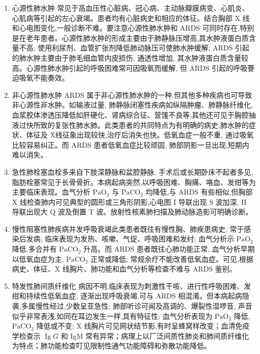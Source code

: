 \documentclass[10pt]{article}
\begin{document}
\begin{enumerate}
  \item 心源性肺水肿 常见于高血压性心脏病、冠心病、主动脉瓣膜病变、心肌炎、心肌病等引起的左心衰竭。患者均有心脏病史和相应的体征。结合胸部 X 线和心电图变化,一般诊断不难。要注意心源性肺水肿和 ARDS 可同时存在,特别是在老年患者。心源性肺水肿的形成主要由于肺静脉压增高,其水肿液蛋白质含量不高, 使用利尿剂、血管扩张剂降低肺动脉压可使肺水肿缓解; ARDS 引起的肺水肿主要由于肺毛细血管内皮损伤, 通透性增加, 其水肿液蛋白质含量较高。心源性肺水肿引起的呼吸困难常可因吸氧而缓解, 但 ARDS 引起的呼吸謇迫吸氧不能奏效。

  \item 非心源性肺水肿 ARDS 属于非心源性肺水肿的一种,但其他多种疾病也可导致非心源性非水肿。如输液过量, 肺静脉闭塞性疾病如纵隔肿瘤、肺静脉纤维化,血浆胶体渗透压降低如肝硬化、肾病综合征、营馐不良等,其他还可见于胸腔抽液过快所致的复张性肺水肺。此类患者的共同特点为有明确的病史,肺水肿的症状、体征及 X线征象出现较快,治疗后消失也快。低氧血症一般不重, 通过吸氧比较容易纠正。而 ARDS 患者低氧血症比较顽固, 肺部阴影一旦出现,短期内难以消失。

  \item 急性肺栓塞血栓多来自下肢深静脉和盆腔静脉, 手术后或长期卧床不起者多见,脂肪栓塞常见于长骨骨折。本病起病突然,以呼吸困难、胸痛、咯血、发绀等为主要临床表现。血气分析 $\mathrm{PaO}_{2}$ 与 $\mathrm{PaCO}_{2}$ 均降低,与 $\mathrm{ARDS}$ 有些相似,但胸部 X 线检查肺内可见典型的圆形或三角形阴影,心电图 I 导联出现 $\mathrm{S}$ 波加深, II 导联出现大 $\mathrm{Q}$ 波及倒置 $\mathrm{T}$ 波。放射性核素肺扫描及肺动脉造影可明确诊断。

  \item 慢性阻塞性肺疾病并发呼吸衰竭此类患者既往有慢性胸、肺疾患病史, 常于感染后发病; 临床表现为发热、咳嗽、气促、呼吸困难和发纣; 血气分析示 $\mathrm{PaO}_{2}$ 降低,多合并有 $\mathrm{PaCO}_{2}$ 升高。而 ARDS 患者既往心肺功能正常, 血气分析早期以低氧血症为主, $\mathrm{PaCO}_{2}$ 正常或降低; 常规余疗不能改善低氧血症。可见,根据病史、体征、X 线胸片、肺功能和血气分析等检查不难与 ARDS 鉴别。

  \item 特发性肺间质纤维化 病因不明,临床表现为刺激性干咳、进行性呼吸困难、发绀和持续性低氧血症, 逐渐出现呼吸衰竭,可与 ARDS 相混淆。但本病起病隐袭,多属慢性经过,少数呈亚急性; 肺部听诊可闻及高调的、爆裂性湿啰音, 声音似乎非常表浅,如同在耳边发生一样,具有特征性; 血气分析表现为 $\mathrm{PaO}_{2}$ 降低, $\mathrm{PaCO}_{2}$ 降低或不变; $\mathrm{X}$ 线胸片可见网状结节影,有时呈蜂窝样改变；血清免疫学检查示 $\operatorname{Ig} G$ 和 IgM 常有异常；病理上以厂泛间质性肺炎和肺间质纤维化为特点；肺功能检查叮见限制性通气功能障碍和弥散功能降低。

\end{enumerate}
\end{document}
